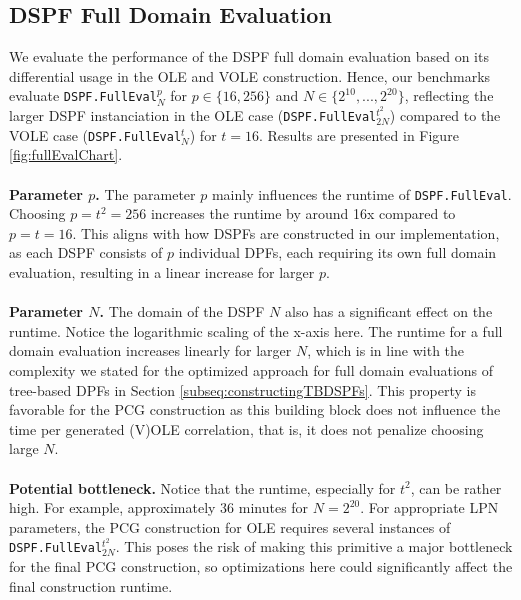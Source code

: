 \subsection{DSPF Full Domain Evaluation}
\label{subsec:evalDspfFullDomain}
We evaluate the performance of the DSPF full domain evaluation based on its differential usage in the OLE and VOLE construction. Hence, our benchmarks evaluate \texttt{DSPF.FullEval}$_N^p$ for $p\in\{16,256\}$ and $N\in\{2^{10}, ..., 2^{20}\}$, reflecting the larger DSPF instanciation in the OLE case (\texttt{DSPF.FullEval}$_{2N}^{t^2}$) compared to the VOLE case (\texttt{DSPF.FullEval}$_{N}^{t}$) for $t=16$. Results are presented in Figure \ref{fig:fullEvalChart}.
\\\\
\textbf{Parameter $p$.} The parameter $p$ mainly influences the runtime of \texttt{DSPF.FullEval}. Choosing $p=t^2=256$ increases the runtime by around 16x compared to $p=t=16$. This aligns with how DSPFs are constructed in our implementation, as each DSPF consists of $p$ individual DPFs, each requiring its own full domain evaluation, resulting in a linear increase for larger $p$.
\\\\
\textbf{Parameter $N$.} The domain of the DSPF $N$ also has a significant effect on the runtime. Notice the logarithmic scaling of the x-axis here. The runtime for a full domain evaluation increases linearly for larger $N$, which is in line with the complexity we stated for the optimized approach for full domain evaluations of tree-based DPFs in Section \ref{subseq:constructingTBDSPFs}. This property is favorable for the PCG construction as this building block does not influence the time per generated (V)OLE correlation, that is, it does not penalize choosing large $N$.
\\\\
\textbf{Potential bottleneck.} Notice that the runtime, especially for $t^2$, can be rather high. For example, approximately 36 minutes for $N=2^{20}$. For appropriate LPN parameters, the PCG construction for OLE requires several instances of \texttt{DSPF.FullEval}$_{2N}^{t^2}$. This poses the risk of making this primitive a major bottleneck for the final PCG construction, so optimizations here could significantly affect the final construction runtime.
\\\\
